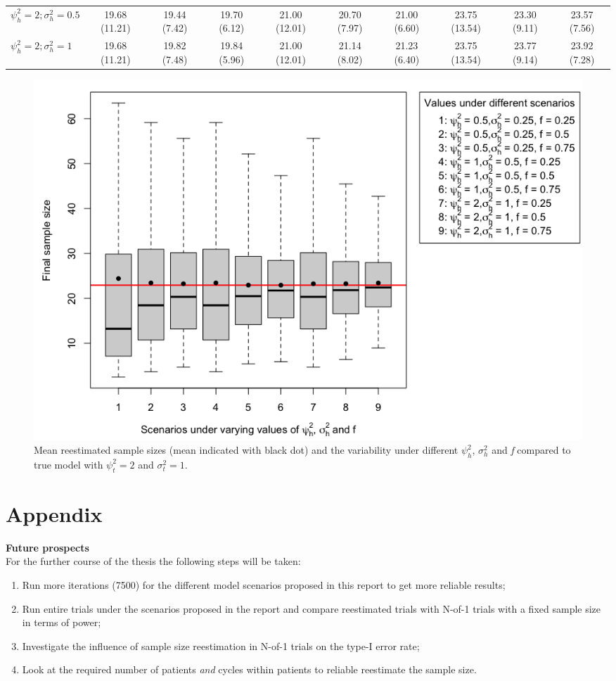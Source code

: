 \documentclass[11pt]{article}
\begin{document}
\begin{landscape}
\begin{table}[]
{\begin{tabular}{l c c c c c c c c c}
          $\psi_h^2 = 2; \sigma_h^2 = 0.5$ & 19.68 (11.21) & 19.44 (7.42) & 19.70 (6.12) & 21.00 (12.01) & 20.70 (7.97) & 21.00 (6.60) & 23.75 (13.54) & 23.30 (9.11) & 23.57 (7.56) \\
          $\psi_h^2 = 2; \sigma_h^2 = 1$ & 19.68 (11.21) & 19.82 (7.48) & 19.84 (5.96) & 21.00 (12.01) & 21.14 (8.02) & 21.23 (6.40) & 23.75 (13.54) & 23.77 (9.14) & 23.92 (7.28) \\
          \bottomrule
\end{tabular}}
\label{tab:T2}
\end{table}
\end{landscape}

\begin{figure}[htb!]
    \centering
    \includegraphics[scale=0.5]{Fig1}
    \caption{Mean reestimated sample sizes (mean indicated with black dot) and the variability under different $\psi_h^2$, $\sigma_h^2$ and \textit{f} compared to true model with $\psi_t^2 = 2$ and $\sigma_t^2 = 1$.}
    \label{fig:F1}
\end{figure}




\newpage
\printbibliography

\newpage
\section*{Appendix}
\textbf{Future prospects} \\
\nodindent For the further course of the thesis the following steps will be taken: 
\begin{enumerate}
    \item Run more iterations (7500) for the different model scenarios proposed in this report to get more reliable results;
    \item Run entire trials under the scenarios proposed in the report and compare reestimated trials with N-of-1 trials with a fixed sample size in terms of power;
    \item Investigate the influence of sample size reestimation in N-of-1 trials on the type-I error rate;
    \item Look at the required number of patients \textit{and} cycles within patients to reliable reestimate the sample size. 
\end{enumerate}
\end{document}
